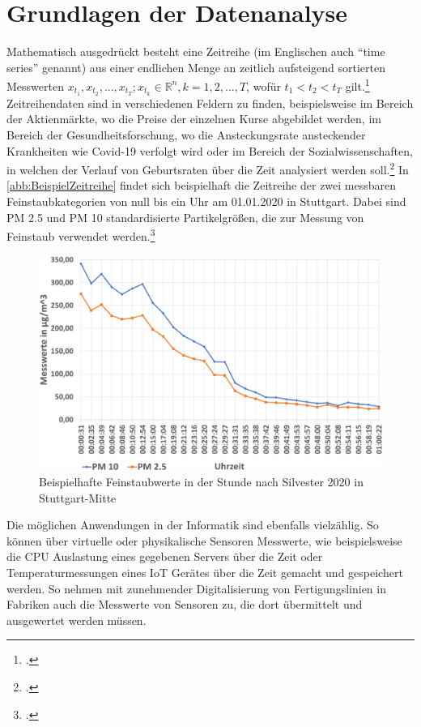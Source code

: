 \section{Grundlagen der Datenanalyse}\label{chap:GrundlagenDatenanalyse}

Mathematisch ausgedrückt besteht eine Zeitreihe (im Englischen auch \enquote{time series} genannt) aus einer endlichen Menge an zeitlich aufsteigend sortierten Messwerten $x_{t_1},x_{t_2},...,x_{t_T};  x_{t_k} \in \mathbb{R}^n, k=1,2,...,T$, wofür $t_1 < t_2 < t_T $ gilt.\footcite[Vgl.][1]{Deistler.2018b} 
Zeitreihendaten sind in verschiedenen Feldern zu finden, beispielsweise im Bereich der Aktienmärkte, wo die Preise der einzelnen Kurse abgebildet werden, im Bereich der Gesundheitsforschung, wo die Ansteckungsrate ansteckender Krankheiten wie Covid-19 verfolgt wird oder im Bereich der Sozialwissenschaften, in welchen der Verlauf von Geburtsraten über die Zeit analysiert werden soll.\footcite[Vgl.][1]{Shumway.2017b} 
In \autoref{abb:BeispielZeitreihe} findet sich beispielhaft die Zeitreihe der zwei messbaren Feinstaubkategorien von null bis ein Uhr am 01.01.2020 in Stuttgart. Dabei sind \ac{PM} 2.5 und \ac{PM} 10 standardisierte Partikelgrößen, die zur Messung von Feinstaub verwendet werden.\footcite[Vgl.][]{EnvironmentalProtectionAgency.o.J.}

\begin{figure}[H]
\centering
\includegraphics[height=0.4\textheight]{graphics/Feinstaub-Stuttgart.png}
\caption{Beispielhafte Feinstaubwerte in der Stunde nach Silvester 2020 in Stuttgart-Mitte}
\label{abb:BeispielZeitreihe}
\end{figure}

Die möglichen Anwendungen in der Informatik sind ebenfalls vielzählig. So können über virtuelle oder physikalische Sensoren Messwerte, wie beispielsweise die CPU Auslastung eines gegebenen Servers über die Zeit oder Temperaturmessungen eines \ac{IoT} Gerätes über die Zeit gemacht und gespeichert werden. So nehmen mit zunehmender Digitalisierung von Fertigungslinien in Fabriken auch die Messwerte von Sensoren zu, die dort übermittelt und ausgewertet werden müssen.


